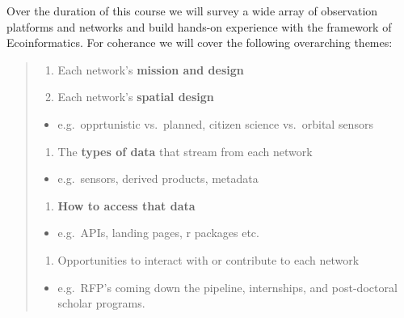 \documentclass[
  letterpaper,
]{book}
\providecommand{\tightlist}{%
  \setlength{\itemsep}{0pt}\setlength{\parskip}{0pt}}
\begin{document}

Over the duration of this course we will survey a wide array of
observation platforms and networks and build hands-on experience with
the framework of Ecoinformatics. For coherance we will cover the
following overarching themes:

\begin{quote}
\begin{enumerate}
\def\labelenumi{\arabic{enumi}.}
\tightlist
\item
  Each network's \textbf{mission and design}
\item
  Each network's \textbf{spatial design}
\end{enumerate}

\begin{itemize}
\tightlist
\item
  e.g.~opprtunistic vs.~planned, citizen science vs.~orbital sensors
\end{itemize}

\begin{enumerate}
\def\labelenumi{\arabic{enumi}.}
\setcounter{enumi}{2}
\tightlist
\item
  The \textbf{types of data} that stream from each network
\end{enumerate}

\begin{itemize}
\tightlist
\item
  e.g.~sensors, derived products, metadata
\end{itemize}

\begin{enumerate}
\def\labelenumi{\arabic{enumi}.}
\setcounter{enumi}{3}
\tightlist
\item
  \textbf{How to access that data}
\end{enumerate}

\begin{itemize}
\tightlist
\item
  e.g.~APIs, landing pages, r packages etc.
\end{itemize}

\begin{enumerate}
\def\labelenumi{\arabic{enumi}.}
\setcounter{enumi}{4}
\tightlist
\item
  Opportunities to interact with or contribute to each network
\end{enumerate}

\begin{itemize}
\tightlist
\item
  e.g.~RFP's coming down the pipeline, internships, and post-doctoral
  scholar programs.
\end{itemize}
\end{quote}
\end{document}
